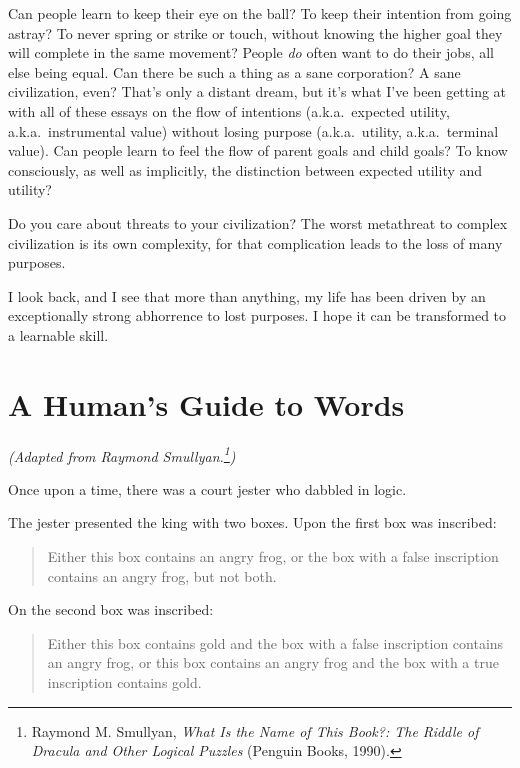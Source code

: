 {{{
 Can people learn to keep their eye on the ball? To keep their
intention from going astray? To never spring or strike or touch,
without knowing the higher goal they will complete in the same
movement? People \textit{do} often want to do their jobs, all else
being equal. Can there be such a thing as a sane corporation? A sane
civilization, even? That's only a distant dream, but
it's what I've been getting at with all
of these essays on the flow of intentions (a.k.a.~expected utility,
a.k.a.~instrumental value) without losing purpose (a.k.a.~utility,
a.k.a.~terminal value). Can people learn to feel the flow of parent
goals and child goals? To know consciously, as well as implicitly, the
distinction between expected utility and utility?}

{
 Do you care about threats to your civilization? The worst
metathreat to complex civilization is its own complexity, for that
complication leads to the loss of many purposes.}

{
 I look back, and I see that more than anything, my life has been
driven by an exceptionally strong abhorrence to lost purposes. I hope
it can be transformed to a learnable skill.}

\myendsectiontext


\bigskip

\chapter{A Human's Guide to Words}


{
 \textit{(Adapted from Raymond
Smullyan.}\textit{\footnote{Raymond M. Smullyan, \textit{What Is the Name of This Book?:
The Riddle of Dracula and Other Logical Puzzles} (Penguin Books,
1990).}}\textit{)} }

{
 Once upon a time, there was a court jester who dabbled in logic.}

{
 The jester presented the king with two boxes. Upon the first box
was inscribed:}

\begin{quote}
{
 Either this box contains an angry frog, or the box with a false
 inscription contains an angry frog, but not both.}
\end{quote}

{
 On the second box was inscribed:}

\begin{quote}
{
 Either this box contains gold and the box with a false inscription
contains an angry frog, or this box contains an angry frog and the box
with a true inscription contains gold.}
\end{quote}

}}
